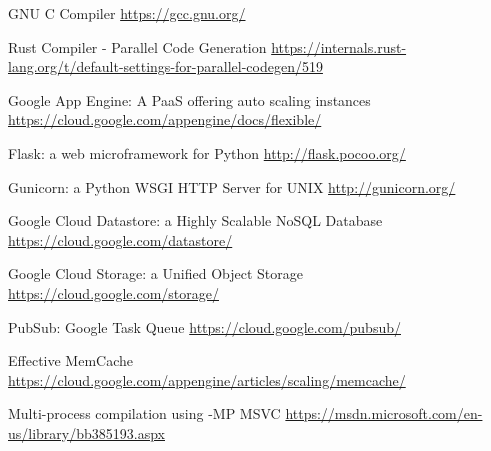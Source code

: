 \documentclass[conference]{IEEEtran}
\begin{document}
\begin{thebibliography}{00}

    GNU C Compiler
    \url{https://gcc.gnu.org/}

    Rust Compiler - Parallel Code Generation
    \url{https://internals.rust-lang.org/t/default-settings-for-parallel-codegen/519}


    Google App Engine: A PaaS offering auto scaling instances
    \url{https://cloud.google.com/appengine/docs/flexible/}

    Flask: a web microframework for Python
    \url{http://flask.pocoo.org/}

    Gunicorn: a Python WSGI HTTP Server for UNIX
    \url{http://gunicorn.org/}

    Google Cloud Datastore: a Highly Scalable NoSQL Database
    \url{https://cloud.google.com/datastore/}

    Google Cloud Storage: a Unified Object Storage
    \url{https://cloud.google.com/storage/}

   PubSub: Google Task Queue
    \url{https://cloud.google.com/pubsub/}

   Effective MemCache
    \url{https://cloud.google.com/appengine/articles/scaling/memcache/}

 	Multi-process compilation using -MP MSVC
 	\url{https://msdn.microsoft.com/en-us/library/bb385193.aspx}

\end{thebibliography}
\end{document}
